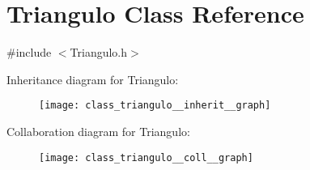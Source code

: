 \hypertarget{class_triangulo}{\section{Triangulo Class Reference}
\label{class_triangulo}
}


{\ttfamily \#include $<$Triangulo.\+h$>$}



Inheritance diagram for Triangulo\+:
\nopagebreak
\begin{figure}[H]
\begin{center}
\leavevmode
\texttt{[image: class\_triangulo\_\_inherit\_\_graph]}
\end{center}
\end{figure}


Collaboration diagram for Triangulo\+:
\nopagebreak
\begin{figure}[H]
\begin{center}
\leavevmode
\texttt{[image: class\_triangulo\_\_coll\_\_graph]}
\end{center}
\end{figure}
